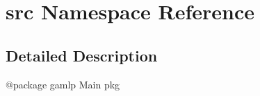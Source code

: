 \hypertarget{namespacesrc}{}\section{src Namespace Reference}
\label{namespacesrc}


\subsection{Detailed Description}
\begin{DoxyVerb}@package gamlp
Main pkg
\end{DoxyVerb}
 